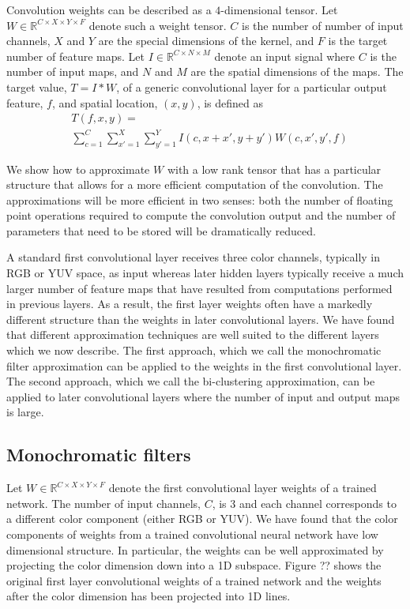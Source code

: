 Convolution weights can be described as a $4$-dimensional tensor. Let $W \in \mathbb{R}^{C \times X \times Y \times F}$ 
denote such a weight tensor. $C$ is the number of number of input channels, $X$ and $Y$ are the special dimensions of the kernel, and $F$ is the target number of feature maps.
Let $I \in \mathbb{R}^{C \times N \times M}$ denote an input signal where $C$ is the number of input maps, and $N$ and $M$ are the spatial dimensions of the maps.
The target value, $T = I \ast W$, of a generic convolutional layer for a particular output feature, $f$, and spatial location, $(x, y)$, is defined as
\begin{align*}
\label{convlayereq}
&T(f,x,y) = \\
&\sum_{c=1}^C \sum_{x'=1}^{X} \sum_{y'=1}^{Y} I(c,x+x',y+y') W(c,x',y',f)
\end{align*}

We show how to approximate $W$ with a low rank tensor that has a particular structure that allows for a more efficient computation of the convolution. The approximations will be more efficient in two senses: both the number of floating point operations required to compute the convolution output and the number of parameters that need to be stored will be dramatically reduced. 

A standard first convolutional layer receives three color channels, typically in RGB or YUV space, as input whereas later hidden layers typically receive a much larger number of feature maps that have resulted from computations performed in previous layers. As a result, the first layer weights often have a markedly different structure than the weights in later convolutional layers. We have found that different approximation techniques are well suited to the different layers which we now describe. The first approach, which we call the monochromatic filter approximation can be applied to the weights in the first convolutional layer. The second approach, which we call the bi-clustering approximation,  can be applied to later convolutional layers where the number of input and output maps is large. 

\subsection{Monochromatic filters}
Let $W \in \mathbb{R}^{C \times X \times Y \times F}$ denote the first convolutional layer weights of a trained network. The number of input channels, $C$, is 3 and each channel corresponds to a different color component (either RGB or YUV). We have found that the color components of weights from a trained convolutional neural network have low dimensional structure. In particular, the weights can be well approximated by projecting the color dimension down into a 1D subspace. Figure ?? shows the original first layer convolutional weights of a trained network and the weights after the color dimension has been projected into 1D lines. 

